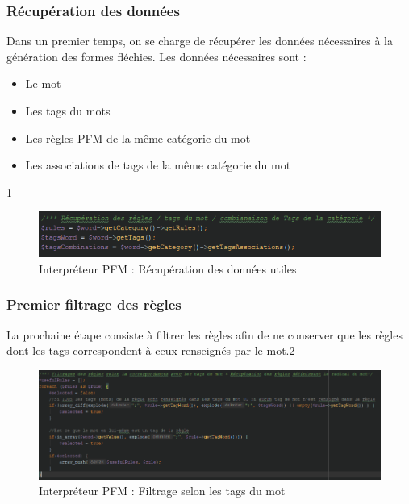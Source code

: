 \documentclass[12pt,a4paper]{article}
\begin{document}
    \subsubsection{Récupération des données}
    Dans un premier temps, on se charge de récupérer les données nécessaires à la génération des formes fléchies.
    Les données nécessaires sont :
    \begin{itemize}
        \item Le mot
        \item Les tags du mots
        \item Les règles PFM de la même catégorie du mot
        \item Les associations de tags de la même catégorie du mot
    \end{itemize}
    \ref{PFM1}
    \smallbreak

    \begin{figure}[h]
        \centering
        \includegraphics[width=150mm]{img/interpreteur_getData.PNG}
        \caption{Interpréteur PFM : Récupération des données utiles}
        \label{PFM1}
    \end{figure}

    \subsubsection{Premier filtrage des règles}

    La prochaine étape consiste à filtrer les règles afin de ne conserver que les règles dont les tags correspondent à ceux renseignés par le mot.\ref{PFM2}

    \begin{figure}[h]
        \centering
        \includegraphics[width=150mm]{img/interpreteur_Filtrage1.PNG}
        \caption{Interpréteur PFM : Filtrage selon les tags du mot}
        \label{PFM2}
    \end{figure}
\end{document}
